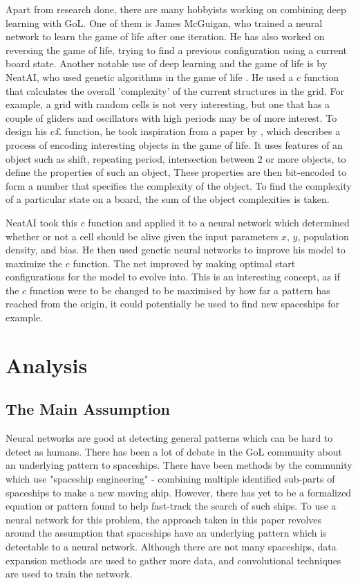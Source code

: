 \documentclass{l4proj}
\begin{document}
Apart from research done, there are many hobbyists working on combining deep learning with GoL. One of them is James McGuigan, who trained a neural network to learn the game of life after one iteration. He has also worked on reversing the game of life, trying to find a previous configuration using a current board state. Another notable use of deep learning and the game of life is by NeatAI, who used genetic algorithms in the game of life \cite{neatai_gol}. He used a $c$ function that calculates the overall 'complexity' of the current structures in the grid. For example, a grid with random cells is not very interesting, but one that has a couple of gliders and oscillators with high periods may be of more interest. To design his $c£$ function, he took inspiration from a paper by \cite{algorithmic_specified_complexity}, which describes a process of encoding interesting objects in the game of life. It uses features of an object such as shift, repeating period, intersection between 2 or more objects, to define the properties of such an object, These properties are then bit-encoded to form a number that specifies the complexity of the object. To find the complexity of a particular state on a board, the sum of the object complexities is taken.

NeatAI took this $c$ function and applied it to a neural network which determined whether or not a cell should be alive given the input parameters $x$, $y$, population density, and bias. He then used genetic neural networks to improve his model to maximize the $c$ function. The net improved by making optimal start configurations for the model to evolve into. This is an interesting concept, as if the $c$ function were to be changed to be maximised by how far a pattern has reached from the origin, it could potentially be used to find new spaceships for example.



\chapter{Analysis}

\section{The Main Assumption}
Neural networks are good at detecting general patterns which can be hard to detect as humans. There has been a lot of debate in the GoL community about an underlying pattern to spaceships. There have been methods by the community which use "spaceship engineering" - combining multiple identified sub-parts of spaceships to make a new moving ship. However, there has yet to be a formalized equation or pattern found to help fast-track the search of such ships. To use a neural network for this problem, the approach taken in this paper revolves around the assumption that spaceships have an underlying pattern which is detectable to a neural network. Although there are not many spaceships, data expansion methods are used to gather more data, and convolutional techniques are used to train the network.
\end{document}
